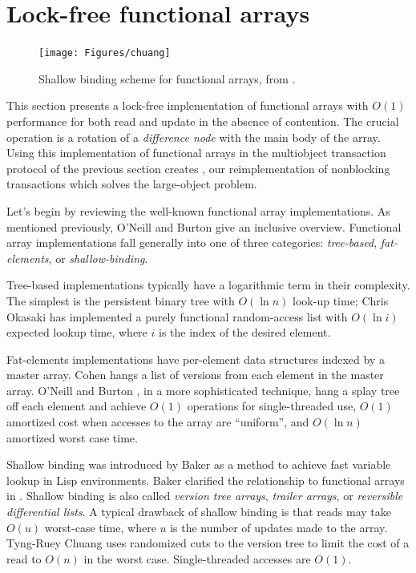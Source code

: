 \section{Lock-free functional arrays}\label{sec:lf-fun-arr}
\begin{figure}[tp]\centering
\texttt{[image: Figures/chuang]}
\caption[Shallow binding scheme for functional arrays.]
  {Shallow binding scheme for functional arrays, from
  \cite[Figure~1]{Chuang94}.}
\label{fig:chuang}
\end{figure}
This section presents a lock-free implementation of functional
arrays with $O(1)$ performance for both read and update in the absence of contention.
The crucial operation is a rotation of a \emph{difference node} with the
main body of the array. Using this implementation of functional arrays
in the multiobject transaction protocol of the previous section
creates \lapex, our reimplementation of nonblocking transactions which
solves the large-object problem.

Let's begin by reviewing the well-known functional array
implementations.  As mentioned previously,
O'Neill and Burton \cite{ONeillBu97} give an
inclusive overview.  Functional array implementations fall generally
into one of three categories: \emph{tree-based}, \emph{fat-elements},
or \emph{shallow-binding}.

Tree-based implementations typically have a logarithmic term in their
complexity.  The simplest is the persistent binary tree with $O(\ln
n)$ look-up time; Chris Okasaki 
\cite{Okasaki95} has implemented a purely functional random-access list
with $O(\ln i)$ expected lookup time, where $i$ is the index of the
desired element.

Fat-elements implementations have per-element data structures indexed
by a master array. Cohen \cite{Cohen84} hangs a list of
versions from each element in the master array.
O'Neill and Burton \cite{ONeillBu97}, in a more sophisticated
technique, hang a splay tree off each element and achieve $O(1)$
operations for single-threaded use, $O(1)$ amortized cost when
accesses to the array are ``uniform'', and $O(\ln n)$ amortized worst
case time. 

Shallow binding was introduced by Baker \cite{Baker78} as a method to
achieve fast variable lookup in Lisp environments.  Baker clarified
the relationship to functional arrays in \cite{Baker91}.  Shallow
binding is also called \emph{version tree arrays}, \emph{trailer
  arrays}, or \emph{reversible differential lists}.  A typical
drawback of shallow binding is that reads may take $O(u)$ worst-case
time, where $u$ is the number of updates made to the array.  Tyng-Ruey
Chuang \cite{Chuang94} uses randomized cuts to the version tree to limit
the cost of a read to $O(n)$ in the worst case.  Single-threaded
accesses are $O(1)$.

